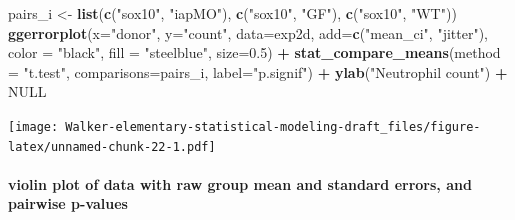 \documentclass[]{book}
\newenvironment{Shaded}{\begin{snugshade}}{\end{snugshade}}
\newcommand{\KeywordTok}[1]{\textcolor[rgb]{0.13,0.29,0.53}{\textbf{#1}}}
\newcommand{\DataTypeTok}[1]{\textcolor[rgb]{0.13,0.29,0.53}{#1}}
\newcommand{\FloatTok}[1]{\textcolor[rgb]{0.00,0.00,0.81}{#1}}
\newcommand{\StringTok}[1]{\textcolor[rgb]{0.31,0.60,0.02}{#1}}
\newcommand{\OtherTok}[1]{\textcolor[rgb]{0.56,0.35,0.01}{#1}}
\newcommand{\OperatorTok}[1]{\textcolor[rgb]{0.81,0.36,0.00}{\textbf{#1}}}
\newcommand{\NormalTok}[1]{#1}
\let\oldparagraph\paragraph
\renewcommand{\paragraph}[1]{\oldparagraph{#1}\mbox{}}
\begin{document}
\begin{Shaded}
\begin{Highlighting}[]
\NormalTok{pairs_i <-}\StringTok{ }\KeywordTok{list}\NormalTok{(}\KeywordTok{c}\NormalTok{(}\StringTok{"sox10"}\NormalTok{, }\StringTok{"iapMO"}\NormalTok{), }\KeywordTok{c}\NormalTok{(}\StringTok{"sox10"}\NormalTok{, }\StringTok{"GF"}\NormalTok{), }\KeywordTok{c}\NormalTok{(}\StringTok{"sox10"}\NormalTok{, }\StringTok{"WT"}\NormalTok{))}
\KeywordTok{ggerrorplot}\NormalTok{(}\DataTypeTok{x=}\StringTok{"donor"}\NormalTok{, }
          \DataTypeTok{y=}\StringTok{"count"}\NormalTok{, }
          \DataTypeTok{data=}\NormalTok{exp2d,}
          \DataTypeTok{add=}\KeywordTok{c}\NormalTok{(}\StringTok{"mean_ci"}\NormalTok{, }\StringTok{"jitter"}\NormalTok{),}
          \DataTypeTok{color =} \StringTok{"black"}\NormalTok{,}
          \DataTypeTok{fill =} \StringTok{"steelblue"}\NormalTok{,}
          \DataTypeTok{size=}\FloatTok{0.5}\NormalTok{) }\OperatorTok{+}
\StringTok{  }\KeywordTok{stat_compare_means}\NormalTok{(}\DataTypeTok{method =} \StringTok{"t.test"}\NormalTok{, }\DataTypeTok{comparisons=}\NormalTok{pairs_i, }\DataTypeTok{label=}\StringTok{"p.signif"}\NormalTok{) }\OperatorTok{+}
\StringTok{  }\KeywordTok{ylab}\NormalTok{(}\StringTok{"Neutrophil count"}\NormalTok{) }\OperatorTok{+}
\StringTok{  }\OtherTok{NULL}
\end{Highlighting}
\end{Shaded}

\texttt{[image: Walker-elementary-statistical-modeling-draft\_files/figure-latex/unnamed-chunk-22-1.pdf]}

\paragraph{violin plot of data with raw group mean and standard errors,
and pairwise
p-values}\label{violin-plot-of-data-with-raw-group-mean-and-standard-errors-and-pairwise-p-values}
\end{document}
